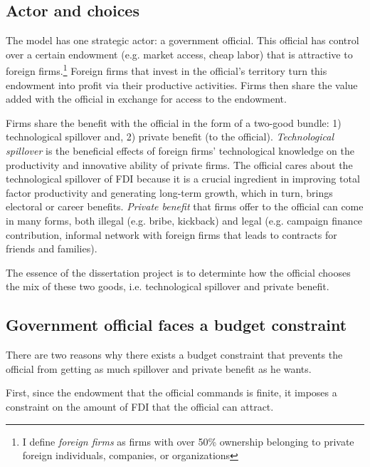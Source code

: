 \subsection{Actor and choices}

The model has one strategic actor: a government official. This official has control over a certain endowment (e.g. market access, cheap labor) that is attractive to foreign firms.\footnote{I define  \textit{foreign firms} as firms with over 50\% ownership belonging to private foreign individuals, companies, or organizations} Foreign firms that invest in the official's territory turn this endowment into profit via their productive activities. Firms then share the value added with the official in exchange for access to the endowment. 

Firms share the benefit with the official in the form of a two-good bundle: 1) technological spillover and, 2) private benefit (to the official). \textit{Technological spillover} is the beneficial effects of foreign firms' technological knowledge on the productivity and innovative ability of private firms. The official cares about the technological spillover of FDI because it is a crucial ingredient in improving total factor productivity and generating long-term growth, which in turn, brings electoral or career benefits. \textit{Private benefit} that firms offer to the official can come in many forms, both illegal (e.g. bribe, kickback) and legal (e.g. campaign finance contribution, informal network with foreign firms that leads to contracts for friends and families).

The essence of the dissertation project is to determinte how the official chooses the mix of these two goods, i.e. technological spillover and private benefit.

\subsection{Government official faces a budget constraint}

There are two reasons why there exists a budget constraint that prevents the official from getting as much spillover and private benefit as he wants.

First, since the endowment that the official commands is finite, it imposes a constraint on the amount of FDI that the official can attract.

